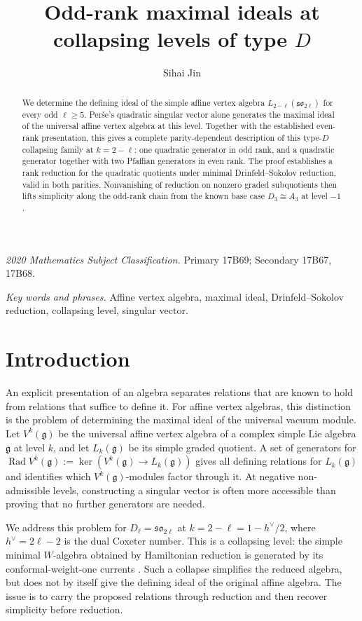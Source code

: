 \documentclass[11pt]{article}
\title{Odd-rank maximal ideals at collapsing levels of type $D$}
\author{Sihai Jin}
\date{}
\newcommand{\g}{\mathfrak g}
\newcommand{\Rad}{\operatorname{Rad}}
\begin{document}
\maketitle

\begin{abstract}
We determine the defining ideal of the simple affine vertex algebra
$L_{2-\ell}(\mathfrak{so}_{2\ell})$ for every odd $\ell\ge5$.
Per\v{s}e's quadratic singular vector alone generates the maximal ideal of
the universal affine vertex algebra at this level.  Together with the
established even-rank presentation, this gives a complete parity-dependent
description of this type-$D$ collapsing family at $k=2-\ell$: one quadratic
generator in
odd rank, and a quadratic generator together with two Pfaffian generators
in even rank.  The proof establishes a rank reduction for the quadratic
quotients under minimal Drinfeld--Sokolov reduction, valid in both parities.
Nonvanishing of reduction on nonzero graded subquotients then lifts
simplicity along the odd-rank chain from the known base case $D_3\cong A_3$
at level $-1$.
\end{abstract}

\medskip
\noindent\textit{2020 Mathematics Subject Classification.} Primary 17B69;
Secondary 17B67, 17B68.

\noindent\textit{Key words and phrases.} Affine vertex algebra, maximal ideal,
Drinfeld--Sokolov reduction, collapsing level, singular vector.

\section{Introduction}

An explicit presentation of an algebra separates relations that are known
to hold from relations that suffice to define it.  For affine vertex
algebras, this distinction is the problem of determining the maximal ideal
of the universal vacuum module.  Let $V^k(\g)$ be the universal affine
vertex algebra of a complex simple Lie algebra $\g$ at level $k$, and let
$L_k(\g)$ be its simple graded quotient.  A set of generators for
$\Rad V^k(\g):=\ker(V^k(\g)\to L_k(\g))$ gives all defining relations for
$L_k(\g)$ and identifies which $V^k(\g)$-modules factor through it.
At negative non-admissible levels, constructing a singular vector is often
more accessible than proving that no further generators are needed.

We address this problem for $D_\ell=\mathfrak{so}_{2\ell}$ at
$k=2-\ell=1-h^\vee/2$, where $h^\vee=2\ell-2$ is the dual Coxeter number.
This is a collapsing level: the simple minimal $W$-algebra obtained by
Hamiltonian reduction is generated by its conformal-weight-one currents
\cite[Theorem~3.3 and Table~4]{AKMPPStructural}.  Such a collapse simplifies the reduced algebra,
but does not by itself give the defining ideal of the original affine
algebra.  The issue is to carry the proposed relations through reduction
and then recover simplicity before reduction.
\end{document}

